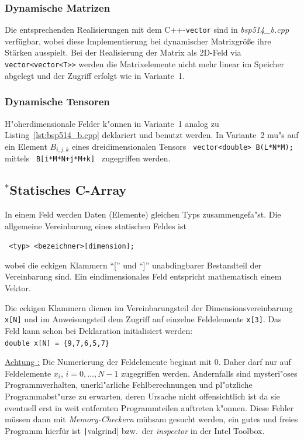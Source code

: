 \subsubsection{Dynamische Matrizen}
\label{p:5.1.4.b}
%
Die entsprechenden Realisierungen mit dem C++-\texttt{vector} sind
in \emph{bsp514\_b.cpp} verfügbar, wobei diese Implementierung
bei dynamischer Matrixgröße ihre Stärken ausspielt. 
%
Bei der Realisierung der Matrix als 2D-Feld via \verb|vector<vector<T>>| werden die
Matrixelemente nicht mehr linear im Speicher abgelegt und der Zugriff erfolgt wie in Variante~1.
%
%
\subsubsection{Dynamische Tensoren}
\label{p:5.1.4.c}
H"oherdimensionale Felder k"onnen in Variante~1 analog zu Listing~\ref{lst:bsp514_b.cpp} 
deklariert und benutzt werden. 
In Variante~2 mu"s auf ein Element $B_{i,j,k}$ eines dreidimensionalen
Tensors  \verb| vector<double> B(L*N*M); | mittels \verb| B[i*M*N+j*M+k] | zugegriffen
werden.
%
\ifcteil                        %
\subsection{\mbox{}$^{*}$Statisches C-Array}
\label{sec:5.1.3}
%
In einem Feld werden Daten (Elemente) gleichen Typs zusammengefa"st.
Die allgemeine Vereinbarung eines statischen Feldes ist
\\
\centerline{\texttt{ <typ> <bezeichner>[dimension];}}
%
wobei die eckigen Klammern ``['' und ``]''
unabdingbarer Bestandteil der Vereinbarung  sind.
Ein eindimensionales Feld entspricht mathematisch einem Vektor.
%

Die eckigen Klammern dienen im Vereinbarungsteil der Dimensionsvereinbarung
\verb|x[N]| und  im Anweisungsteil dem Zugriff auf einzelne
Feldelemente \verb|x[3]|\enspace.
Das Feld kann schon bei Deklaration initialisiert werden:
\\
\verb|double x[N] = {9,7,6,5,7}|

\underline{Achtung :} Die Numerierung der Feldelemente
beginnt mit 0. Daher darf nur auf Feldelemente
$x_i$, $i=0,\ldots,N-1$ zugegriffen werden.
Andernfalls sind mysteri"oses Programmverhalten,
unerkl"arliche Fehlberechnungen und pl"otzliche Programmabst"urze
zu erwarten, deren Ursache nicht offensichtlich ist da
sie eventuell erst in weit entfernten Programmteilen auftreten k"onnen.
Diese Fehler müssen dann mit \emph{Memory-Checkern} mühsam gesucht werden, ein
gutes und freies Programm hierfür ist \texttt|valgrind| bzw.\
der \emph{inspector} in der Intel Toolbox.

